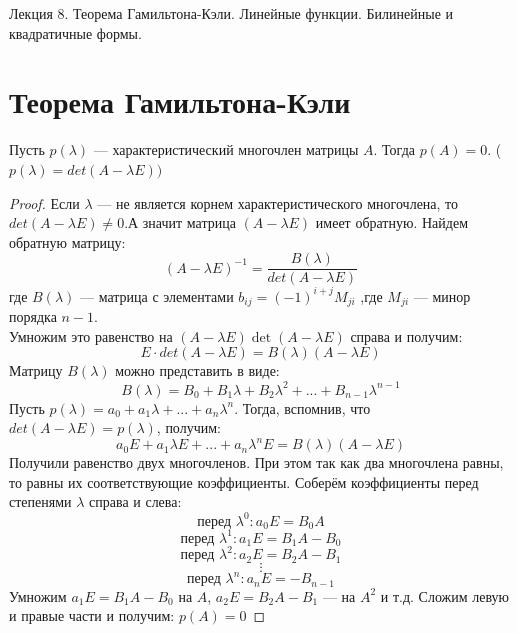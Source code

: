 \documentclass[11pt]{article}
\begin{document}
\begin{titlepage}
    \centering
    \vspace*{\fill}  %

    {\Huge Лекция 8. Теорема Гамильтона-Кэли. Линейные функции. Билинейные и квадратичные формы.
    \par}

    \vspace*{\fill}  %
\end{titlepage}

\setcounter{page}{1}

\section{Теорема Гамильтона-Кэли }

\begin{theorem} Пусть $p(\lambda)$ --- характеристический многочлен матрицы $A$. Тогда $p(A)=0$.
    ($p(\lambda)= det (A-\lambda E))$ 
\end{theorem}

\begin{proof}
    Если $\lambda$ --- не является корнем характеристического многочлена, то $det(A-\lambda E) \neq 0$.А значит матрица $(A-\lambda E)$ имеет обратную.
    Найдем обратную матрицу:
    \[ (A-\lambda E)^{-1} = \frac{B(\lambda)}{det(A-\lambda E)} \]
    где $B(\lambda)$ --- матрица с элементами  $b_{ij}= (-1)^{i+j} M_{ji}$ ,где  $ M_{ji}$ --- минор порядка  $n-1$.\\
    Умножим это равенство на $(A-\lambda E) \det (A - \lambda E)$ справа и получим:
    \[ E \cdot det(A-\lambda E) = B(\lambda) (A-\lambda E) \]
    Матрицу $B(\lambda)$ можно представить в виде: 
    \[ B(\lambda) = B_0+ B_1\lambda + B_2 \lambda ^2 + ... + B_{n-1} \lambda^{n-1}  \]
    Пусть $p(\lambda) = a_0 + a_1\lambda + ... + a_n\lambda^n $. Тогда, вспомнив, что $det(A-\lambda E) = p(\lambda)$, получим:
    \[ a_0 E +a_1 \lambda E + ... + a_n \lambda ^n E =B(\lambda) (A-\lambda E) \]
    Получили равенство двух многочленов. При этом так как два многочлена равны, то равны их соответствующие коэффициенты. 
    Соберём коэффициенты перед степенями $\lambda$ справа и слева:
    \[ \text{перед } \lambda^0: a_0 E = B_0A \]
    \[ \text{перед } \lambda^1: a_1 E = B_1A-B_0 \]
    \[ \text{перед } \lambda^2: a_2 E = B_2A-B_1 \]
    \[ \vdots \]
    \[ \text{перед } \lambda^n: a_n E = -B_{n-1} \] 
    Умножим $a_1 E = B_1A-B_0$ на $A$, $a_2 E = B_2A-B_1$ --- на $A^2$ и т.д. 
    Сложим левую и правые части и получим: $p(A)=0$
\end{proof}
\end{document}
